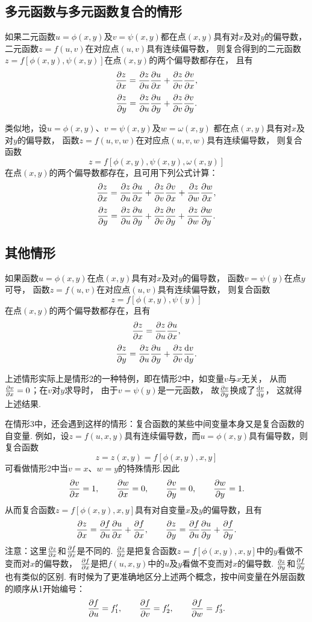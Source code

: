 \subsection{多元函数与多元函数复合的情形}
\begin{theorem}
如果二元函数\(u=\phi(x,y)\)及\(v=\psi(x,y)\)都在点\((x,y)\)具有对\(x\)及对\(y\)的偏导数，
二元函数\(z=f(u,v)\)在对应点\((u,v)\)具有连续偏导数，
则复合得到的二元函数\(z=f[\phi(x,y),\psi(x,y)]\)在点\((x,y)\)的两个偏导数都存在，
且有\[
	\pdv{z}{x} = \pdv{z}{u}\pdv{u}{x} + \pdv{z}{v}\pdv{v}{x},
\]\[
	\pdv{z}{y} = \pdv{z}{u}\pdv{u}{y} + \pdv{z}{v}\pdv{v}{y}.
\]
\end{theorem}
类似地，设\(u=\phi(x,y)\)、\(v=\psi(x,y)\)及\(w=\omega(x,y)\)
都在点\((x,y)\)具有对\(x\)及对\(y\)的偏导数，
函数\(z=f(u,v,w)\)在对应点\((u,v,w)\)具有连续偏导数，
则复合函数\[
	z = f[\phi(x,y),\psi(x,y),\omega(x,y)]
\]
在点\((x,y)\)的两个偏导数都存在，且可用下列公式计算：\[
	\pdv{z}{x} = \pdv{z}{u}\pdv{u}{x} + \pdv{z}{v}\pdv{v}{x} + \pdv{z}{w}\pdv{w}{x},
\]\[
	\pdv{z}{y} = \pdv{z}{u}\pdv{u}{y} + \pdv{z}{v}\pdv{v}{y} + \pdv{z}{w}\pdv{w}{y}.
\]

\subsection{其他情形}
\begin{theorem}
如果函数\(u=\phi(x,y)\)在点\((x,y)\)具有对\(x\)及对\(y\)的偏导数，
函数\(v=\psi(y)\)在点\(y\)可导，
函数\(z=f(u,v)\)在对应点\((u,v)\)具有连续偏导数，
则复合函数\[
	z = f[\phi(x,y),\psi(y)]
\]
在点\((x,y)\)的两个偏导数都存在，且有\[
	\pdv{z}{x} = \pdv{z}{u} \pdv{u}{x},
\]\[
	\pdv{z}{y} = \pdv{z}{u} \pdv{u}{y} + \pdv{z}{v} \dv{v}{y}.
\]
\end{theorem}
上述情形实际上是情形2的一种特例，即在情形2中，如变量\(v\)与\(x\)无关，
从而\(\pdv{v}{x}=0\)；在\(v\)对\(y\)求导时，
由于\(v=\psi(y)\)是一元函数，
故\(\pdv{v}{y}\)换成了\(\dv{v}{y}\)，
这就得上述结果.

在情形3中，还会遇到这样的情形：复合函数的某些中间变量本身又是复合函数的自变量.
例如，设\(z = f(u,x,y)\)具有连续偏导数，而\(u=\phi(x,y)\)具有偏导数，则复合函数\[
z = z(x,y) = f[\phi(x,y),x,y]
\]可看做情形2中当\(v=x\)、\(w=y\)的特殊情形.因此\[
	\pdv{v}{x} = 1, \qquad
	\pdv{w}{x} = 0, \qquad
	\pdv{v}{y} = 0, \qquad
	\pdv{w}{y} = 1.
\]
从而复合函数\(z = f[\phi(x,y),x,y]\)具有对自变量\(x\)及\(y\)的偏导数，且有\[
	\pdv{z}{x} = \pdv{f}{u} \pdv{u}{x} + \pdv{f}{x},
	\qquad
	\pdv{z}{y} = \pdv{f}{u} \pdv{u}{y} + \pdv{f}{y}.
\]
注意：这里\(\pdv{z}{x}\)和\(\pdv{f}{x}\)是不同的.
\(\pdv{z}{x}\)是把复合函数\(z = f[\phi(x,y),x,y]\)中的\(y\)看做不变而对\(x\)的偏导数，
\(\pdv{f}{x}\)是把\(f(u,x,y)\)中的\(u\)及\(y\)看做不变而对\(x\)的偏导数.
\(\pdv{z}{y}\)和\(\pdv{f}{y}\)也有类似的区别.
有时候为了更准确地区分上述两个概念，按中间变量在外层函数的顺序从1开始编号：\[
	\pdv{f}{u} = f_1', \qquad
	\pdv{f}{v} = f_2', \qquad
	\pdv{f}{w} = f_3'.
\]

